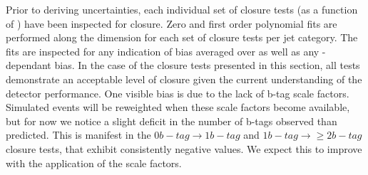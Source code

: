 Prior to deriving uncertainties, each individual set of closure tests
(as a function of \scalht) have been inspected for closure. Zero and
first order polynomial fits are performed along the \scalht dimension
for each set of closure tests per jet category. The fits are inspected
for any indication of bias averaged over \scalht as well as any
\scalht-dependant bias. In the case of the closure tests presented in
this section, all tests demonstrate an acceptable level of closure
given the current understanding of the detector performance. One
visible bias is due to the lack of b-tag scale factors. Simulated
events will be reweighted when these scale factors become available,
but for now we notice a slight deficit in the number of b-tags
observed than predicted. This is manifest in the $0 b-tag \rightarrow
1 b-tag$ and $1 b-tag \rightarrow \geq 2 b-tag$ closure tests, that
exhibit consistently negative values. We expect this to improve with
the application of the scale factors.

